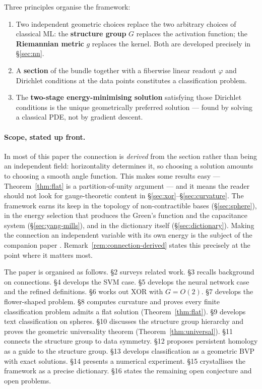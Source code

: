 \documentclass[11pt, a4paper]{article}
\theoremstyle{plain}
\theoremstyle{definition}
\begin{document}
Three principles organise the framework:
\begin{enumerate}[label=(\arabic*), itemsep=2pt]
  \item Two independent geometric choices replace the two arbitrary choices of
        classical ML: the \textbf{structure group} $G$ replaces the activation
        function; the \textbf{Riemannian metric} $g$ replaces the kernel.
        Both are developed precisely in \S\ref{sec:nn}.
  \item A \textbf{section} of the bundle together with a fiberwise linear readout
        $\varphi$ and Dirichlet conditions at the data points constitutes a
        classification problem.
  \item The \textbf{two-stage energy-minimising solution} satisfying those Dirichlet
        conditions is the unique geometrically preferred solution --- found by
        solving a classical PDE, not by gradient descent.
\end{enumerate}

\paragraph{Scope, stated up front.}
In most of this paper the connection is \emph{derived} from the section rather
than being an independent field: horizontality determines it, so choosing a
solution amounts to choosing a smooth angle function. This makes some results
easy --- Theorem~\ref{thm:flat} is a partition-of-unity argument --- and it means
the reader should not look for gauge-theoretic content in
\S\ref{sec:xor}--\S\ref{sec:curvature}. The framework earns its keep in the
topology of non-contractible bases (\S\ref{sec:sphere}), in the energy selection
that produces the Green's function and the capacitance system
(\S\ref{sec:yang-mills}), and in the dictionary itself
(\S\ref{sec:dictionary}). Making the connection an independent variable with its
own energy is the subject of the companion paper \cite{Vasii2026Paper2}.
Remark~\ref{rem:connection-derived} states this precisely at the point where it
matters most.

The paper is organised as follows. \S2 surveys related work. \S3 recalls
background on connections. \S4 develops the SVM case. \S5 develops the neural
network case and the refined definitions. \S6 works out XOR with $G = O(2)$.
\S7 develops the flower-shaped problem. \S8 computes curvature and proves every
finite classification problem admits a flat solution (Theorem~\ref{thm:flat}).
\S9 develops text classification on spheres. \S10 discusses the structure group
hierarchy and proves the geometric universality theorem
(Theorem~\ref{thm:universal}). \S11 connects the structure group to data
symmetry. \S12 proposes persistent homology as a guide to the structure group.
\S13 develops classification as a geometric BVP with exact solutions. \S14
presents a numerical experiment. \S15 crystallises the framework as a precise
dictionary. \S16 states the remaining open conjecture and open problems.
\end{document}
